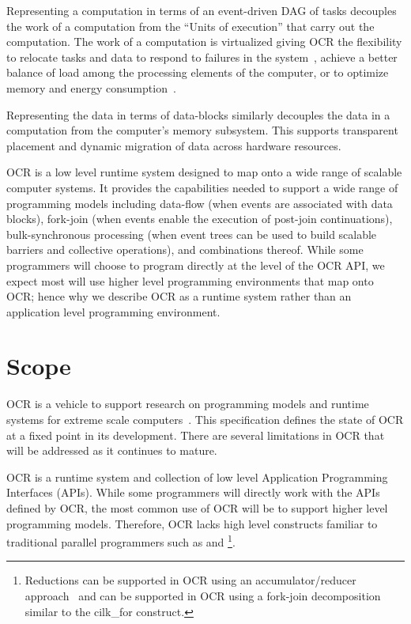 Representing a computation in terms of an event-driven DAG of tasks
decouples the work of a computation
from the ``Units of execution'' that carry out the computation. The work
of a computation is virtualized giving OCR the flexibility to relocate tasks and data
to respond to failures in the system~\cite{Vrvilo14}, achieve a better balance of load
among the processing elements of the computer, or to optimize memory
and energy consumption~\cite{GZCS10,Guo10,CTBCCGYS13,SbBS14}.

Representing the data in terms of data-blocks similarly
decouples the data in a computation from the computer's memory subsystem.
This supports transparent placement and dynamic migration of data
across hardware resources.

OCR is a low level runtime system designed to map onto a wide range of scalable
computer systems.
It provides the capabilities needed to support a wide range of programming models
including data-flow (when events are associated with data blocks),
fork-join (when events enable the execution of post-join
continuations), bulk-synchronous processing (when event trees can be
used to build scalable barriers and collective operations), and
combinations thereof. While some programmers will choose to program directly
at the level of the OCR API, we expect most will use higher level
programming environments that map onto OCR; hence why we describe OCR as a
runtime system rather than an application level programming environment.

\section{Scope}
\label{sec:Scope}

OCR is a vehicle to support research on programming models and
runtime systems for extreme scale
computers~\cite{ExascaleSoftwareStudy2009,SaHS10}. This specification
defines the state of OCR at a fixed point in its development. There
are several limitations in OCR that will be addressed as it continues to
mature.

OCR is a runtime system and collection of low level Application
Programming Interfaces (APIs). While some programmers will directly
work with the APIs defined by OCR, the most common use of OCR will be
to support higher level programming models. Therefore, OCR lacks high
level constructs familiar to traditional parallel programmers such as
 and \footnote{Reductions can be
supported in OCR using an accumulator/reducer
approach~\cite{Frigo:2009:ROC:1583991.1584017,SCZS13} and
 can be supported in OCR
using a fork-join decomposition similar to the cilk\_for construct.}.

